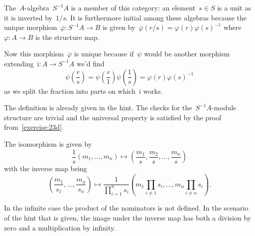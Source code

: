 \begin{exercise}
  \label{exercise:23d}
  The~$A$\nobreakdash-algebra~$S^{-1}A$ is a member of this category: an element~$s\in S$ is a unit as it is inverted by~$1/s$. It is furthermore initial among these algebras because the unique morphism~$\overline{\varphi}\colon S^{-1}A\to B$ is given by~$\overline{\varphi}(r/s)=\varphi(r)\varphi(s)^{-1}$ where~$\varphi\colon A\to B$ is the structure map.

  Now this morphism~$\overline{\varphi}$ is unique because if~$\psi$ would be another morphism extending~$\mathrm{i}\colon A\to S^{-1}A$ we'd find
  \begin{equation}
    \psi\left( \frac{r}{s} \right)=\psi\left( \frac{r}{1} \right)\psi\left( \frac{1}{s} \right)=\varphi(r)\varphi(s)^{-1}
  \end{equation}
  as we split the fraction into parts on which~$\mathrm{i}$ works.
\end{exercise}

\begin{exercise} %
  The definition is already given in the hint. The checks for the~$S^{-1}A$\nobreakdash-module structure are trivial and the universal property is satisfied by the proof from~\autoref{exercise:23d}.
\end{exercise}

\begin{exercise}
  The isomorphism is given by
  \begin{equation}
    \frac{1}{s}\left( m_1,\dots,m_n \right)\mapsto \left( \frac{m_1}{s},\frac{m_2}{s},\dots,\frac{m_n}{s} \right)
  \end{equation}
  with the inverse map being
  \begin{equation}
    \left( \frac{m_1}{s_1},\ldots,\frac{m_n}{s_n} \right)\mapsto\frac{1}{\prod_{i=1}^n s_i}\left( m_1\prod_{i\neq 1}s_i,\ldots,m_n\prod_{i\neq n}s_i \right).
  \end{equation}

  In the infinite case the product of the nominators is not defined. In the scenario of the hint that is given, the image under the inverse map has both a division by zero and a multiplication by infinity.
\end{exercise}

